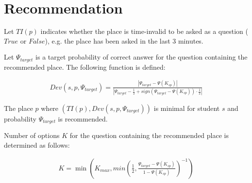 \documentclass[a4paper]{article}
\begin{document}
\section{Recommendation}

Let $TI(p)$ indicates whether the place is time-invalid to be asked as a question ($True$ or $False$), e.g. the place has been asked in the last 3 minutes.

Let $\Psi_{target}$ is a target probability of correct answer for the question containing the recommended place. The following function is defined:

\begin{align}
Dev(s, p, \Psi_{target}) = \frac{\left|\Psi_{target} - \Psi(K_{sp})\right|}{\left|\Psi_{target} - \frac{1}{2} + sign\left(\Psi_{target} - \Psi(K_{sp})\right) \cdot \frac{1}{2}\right|}
\end{align}

The place $p$ where $\left(TI(p), Dev(s, p, \Psi_{target})\right)$ is minimal for student $s$ and
probability $\Psi_{target}$ is recommended.

Number of options $K$ for the question containing the recommended place is determined as follows:

\begin{align}
K = \min\left(K_{max}, min\left(\frac{1}{2}, \frac{\Psi_{target} - \Psi(K_{sp})}{1 - \Psi(K_{sp})}\right)^{-1}\right)
\end{align}
\end{document}
